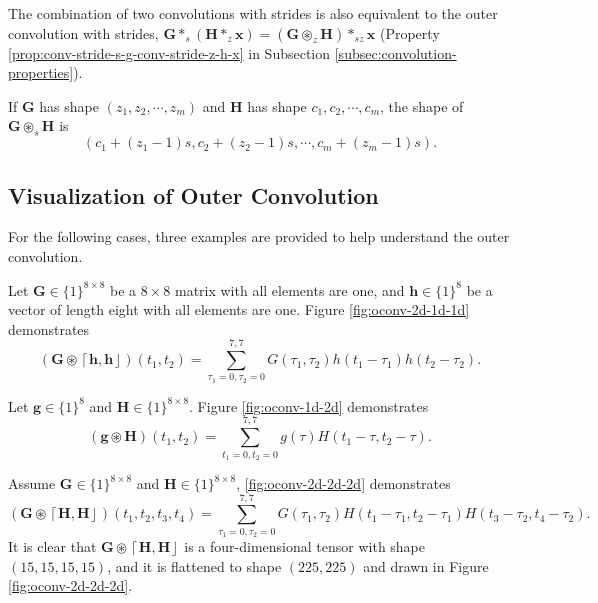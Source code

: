 \documentclass[twoside,11pt]{article}
\def\oconv{\circledast}
\def\tvar#1{\mathbf{#1}} %
\def\lcerfl#1{\left\lceil{#1}\right\rfloor}
\begin{document}
The combination of two convolutions with strides is also equivalent to the outer convolution with strides, \(\tvar{G} *_s (\tvar{H} *_z \tvar{x}) = (\tvar{G} \oconv_z \tvar{H}) *_{sz} \tvar{x}\) (Property \ref{prop:conv-stride-s-g-conv-stride-z-h-x} in Subsection \ref{subsec:convolution-properties}).

\begin{remark}
  If \(\tvar{G}\) has shape \((z_1, z_2, \cdots, z_m)\) and \(\tvar{H}\) has shape \(c_1, c_2, \cdots, c_m\), the shape of \(\tvar{G} \oconv_s \tvar{H}\) is
  \begin{equation*}
    \left(c_1 + (z_1 - 1) s, c_2 + (z_2 - 1) s, \cdots,  c_m + (z_m - 1) s\right).
  \end{equation*}
\end{remark}

\subsection{Visualization of Outer Convolution}
\label{subsec:Visualization-of-outer-convolution}

For the following cases, three examples are provided to help understand the outer convolution.

Let \(\tvar{G} \in \{1\}^{8 \times 8}\) be a \(8 \times 8\) matrix with all elements are one, and \(\tvar{h} \in \{1\}^{8}\) be a vector of length eight with all elements are one. Figure \ref{fig:oconv-2d-1d-1d} demonstrates
\begin{equation*}
  \left(\tvar{G} \oconv \lcerfl{\tvar{h}, \tvar{h}}\right)(t_1, t_2)
  = \sum_{\tau_1 = 0, \tau_2 = 0}^{7,7} G(\tau_1, \tau_2) h(t_1 - \tau_1) h(t_2 - \tau_2).
\end{equation*}

Let \(\tvar{g} \in \{1\}^{8}\) and \(\tvar{H} \in \{1\}^{8 \times 8}\). Figure \ref{fig:oconv-1d-2d} demonstrates
\begin{equation*}
  \left( \tvar{g} \oconv \tvar{H} \right)(t_1, t_2)
  = \sum_{t_1=0, t_2=0}^{7,7} g(\tau) H(t_1 - \tau, t_2 - \tau).
\end{equation*}


Assume \(\tvar{G} \in \{1\}^{8 \times 8}\) and \(\tvar{H} \in \{1\}^{8 \times 8}\), \figurename{} \ref{fig:oconv-2d-2d-2d} demonstrates
\begin{equation*}
  \left( \tvar{G} \oconv \lcerfl{\tvar{H}, \tvar{H}} \right)(t_1, t_2, t_3, t_4)
  = \sum_{\tau_1=0,\tau_2=0}^{7,7}
  G(\tau_1, \tau_2)
  H(t_1 - \tau_1, t_2 - \tau_1)
  H(t_3 - \tau_2, t_4 - \tau_2).
\end{equation*}
It is clear that \(\tvar{G} \oconv \lcerfl{\tvar{H}, \tvar{H}}\) is a four-dimensional tensor with shape \((15, 15, 15, 15)\), and it is flattened to shape \((225, 225)\) and drawn in Figure \ref{fig:oconv-2d-2d-2d}.
\end{document}
